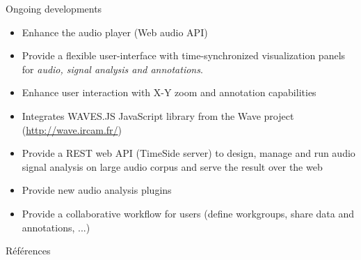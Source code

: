 \documentclass[final, hyperref, table]{beamer}
\begin{document}
\begin{frame}[containsverbatim]{}
\begin{columns}[T]
\begin{column}[T]{.5\linewidth}
  \begin{block}{Ongoing developments}
\vspace{-1cm}
    \begin{multicols}{2}[]
        \begin{itemize}
        \item Enhance the audio player (Web audio API) 
        \item Provide a flexible user-interface with time-synchronized \alert{visualization} panels for \emph{audio, signal analysis and annotations}.
         \item Enhance user interaction with \alert{X-Y zoom} and \alert{annotation} capabilities
          \item Integrates WAVES.JS JavaScript library from the Wave project (\url{http://wave.ircam.fr/})
        \item Provide a REST web API (TimeSide server) to design, manage and run audio signal analysis on large audio corpus and serve the result over the web
        \item Provide new audio analysis plugins
          \item Provide a collaborative workflow for users (define workgroups, share data and annotations, ...)

\end{itemize}
\end{multicols}
\end{block}

\begin{block}{Références}\tiny

\vspace{-1cm}
\begin{multicols}{2}[]

\end{multicols}
\end{block}
  
\end{column}
\end{columns}
\end{frame}
\end{document}
